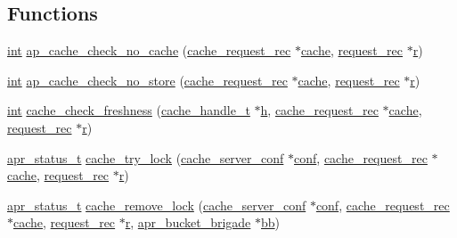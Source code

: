 \subsection*{Functions}
\begin{DoxyCompactItemize}
\item 
\hyperlink{pcre_8txt_a42dfa4ff673c82d8efe7144098fbc198}{int} \hyperlink{group__Cache__util_ga565962a760117aaaed7e13445f79e831}{ap\+\_\+cache\+\_\+check\+\_\+no\+\_\+cache} (\hyperlink{structcache__request__rec}{cache\+\_\+request\+\_\+rec} $\ast$\hyperlink{structcache}{cache}, \hyperlink{structrequest__rec}{request\+\_\+rec} $\ast$\hyperlink{pcregrep_8txt_a2e9e9438b26c0bb4425367a7e4f75eb3}{r})
\item 
\hyperlink{pcre_8txt_a42dfa4ff673c82d8efe7144098fbc198}{int} \hyperlink{group__Cache__util_gabddbd6cc98e9791c643ea64a26e165b0}{ap\+\_\+cache\+\_\+check\+\_\+no\+\_\+store} (\hyperlink{structcache__request__rec}{cache\+\_\+request\+\_\+rec} $\ast$\hyperlink{structcache}{cache}, \hyperlink{structrequest__rec}{request\+\_\+rec} $\ast$\hyperlink{pcregrep_8txt_a2e9e9438b26c0bb4425367a7e4f75eb3}{r})
\item 
\hyperlink{pcre_8txt_a42dfa4ff673c82d8efe7144098fbc198}{int} \hyperlink{group__Cache__util_ga8719ff14e3ad87c32614da9fc10cb119}{cache\+\_\+check\+\_\+freshness} (\hyperlink{group__MOD__CACHE_ga6b7854a2592838a565bdee8f94343aab}{cache\+\_\+handle\+\_\+t} $\ast$\hyperlink{pcregrep_8txt_a373589baca2cb79ec87f46d6599640b9}{h}, \hyperlink{structcache__request__rec}{cache\+\_\+request\+\_\+rec} $\ast$\hyperlink{structcache}{cache}, \hyperlink{structrequest__rec}{request\+\_\+rec} $\ast$\hyperlink{pcregrep_8txt_a2e9e9438b26c0bb4425367a7e4f75eb3}{r})
\item 
\hyperlink{group__apr__errno_gaa5105fa83cc322f09382292db8b47593}{apr\+\_\+status\+\_\+t} \hyperlink{group__Cache__util_gaffa94dfea5098ffab89d1dc91e094415}{cache\+\_\+try\+\_\+lock} (\hyperlink{structcache__server__conf}{cache\+\_\+server\+\_\+conf} $\ast$\hyperlink{group__MOD__PROXY_ga4d7edd451c4bb8ed9ce9012e5dea2b14}{conf}, \hyperlink{structcache__request__rec}{cache\+\_\+request\+\_\+rec} $\ast$\hyperlink{structcache}{cache}, \hyperlink{structrequest__rec}{request\+\_\+rec} $\ast$\hyperlink{pcregrep_8txt_a2e9e9438b26c0bb4425367a7e4f75eb3}{r})
\item 
\hyperlink{group__apr__errno_gaa5105fa83cc322f09382292db8b47593}{apr\+\_\+status\+\_\+t} \hyperlink{group__Cache__util_ga6936350ce1acc1f19e336eb95be153fb}{cache\+\_\+remove\+\_\+lock} (\hyperlink{structcache__server__conf}{cache\+\_\+server\+\_\+conf} $\ast$\hyperlink{group__MOD__PROXY_ga4d7edd451c4bb8ed9ce9012e5dea2b14}{conf}, \hyperlink{structcache__request__rec}{cache\+\_\+request\+\_\+rec} $\ast$\hyperlink{structcache}{cache}, \hyperlink{structrequest__rec}{request\+\_\+rec} $\ast$\hyperlink{pcregrep_8txt_a2e9e9438b26c0bb4425367a7e4f75eb3}{r}, \hyperlink{structapr__bucket__brigade}{apr\+\_\+bucket\+\_\+brigade} $\ast$\hyperlink{group__MOD__PROXY_ga9313a8a2814cff280d5d780c723def3c}{bb})

\end{DoxyCompactItemize}
